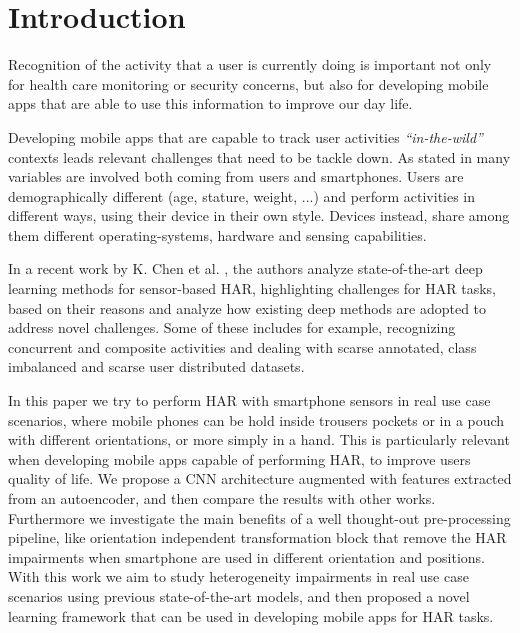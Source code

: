 
\section{Introduction}
\label{sec:introduction}

Recognition of the activity that a user is currently doing is
important not only for health care monitoring or security concerns,
but also for developing mobile apps that are able to use this
information to improve our day life.

Developing mobile apps that are capable to track user activities \textit{``in-the-wild''} contexts leads relevant challenges that need to be tackle
down. As stated in \cite{blunck2013heterogeneity} many variables are
involved both coming from users and smartphones. Users are
demographically different (age, stature, weight, ...) and perform
activities in different ways, using their device in their own
style. Devices instead, share among them different operating-systems,
hardware and sensing capabilities.

In a recent work by K. Chen et al. \cite{chen2020deep}, the authors analyze state-of-the-art
deep learning methods for sensor-based HAR, highlighting challenges for HAR tasks, based on their reasons and analyze how existing deep
methods are adopted to address novel challenges. Some of these
includes for example, recognizing concurrent and composite activities
and dealing with scarse annotated, class imbalanced and scarse user
distributed datasets.

In this paper we try to perform HAR with smartphone sensors in real
use case scenarios, where mobile phones can be hold inside trousers
pockets or in a pouch with different orientations, or more simply in a
hand. This is particularly relevant when developing mobile apps
capable of performing HAR, to improve users quality of life. We
propose a CNN architecture augmented with features extracted from an
autoencoder, and then compare the results with other
works. Furthermore we investigate the main benefits of a well thought-out
pre-processing pipeline, like orientation independent transformation
block that remove the HAR impairments when smartphone are used in
different orientation and positions. With this work we aim to study
heterogeneity impairments in real use case scenarios using previous
state-of-the-art models, and then proposed a novel learning framework
that can be used in developing mobile apps for HAR tasks.


